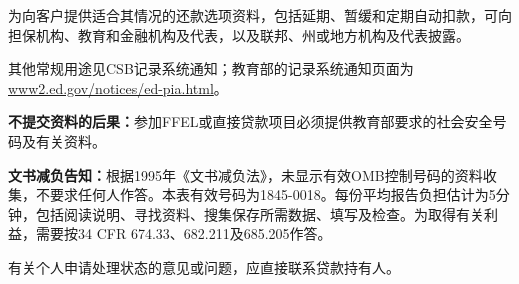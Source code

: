 \documentclass[UTF8,fontset=none,11pt,a4paper]{ctexart}
\begin{document}
为向客户提供适合其情况的还款选项资料，包括延期、暂缓和定期自动扣款，可向担保机构、教育和金融机构及代表，以及联邦、州或地方机构及代表披露。


其他常规用途见CSB记录系统通知；教育部的记录系统通知页面为\url{www2.ed.gov/notices/ed-pia.html}。


\textbf{不提交资料的后果：}参加FFEL或直接贷款项目必须提供教育部要求的社会安全号码及有关资料。


\textbf{文书减负告知：}根据1995年《文书减负法》，未显示有效OMB控制号码的资料收集，不要求任何人作答。本表有效号码为1845-0018。每份平均报告负担估计为5分钟，包括阅读说明、寻找资料、搜集保存所需数据、填写及检查。为取得有关利益，需要按34 CFR 674.33、682.211及685.205作答。


有关个人申请处理状态的意见或问题，应直接联系贷款持有人。
\end{document}
